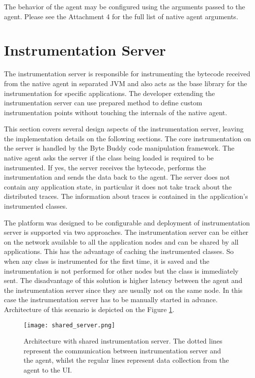 The behavior of the agent may be configured using the arguments passed to the agent. Please see the Attachment 4 for the full list of native agent arguments.

\section{Instrumentation Server}
\label{sec:inst_server}
The instrumentation server is responsible for instrumenting the bytecode received from the native agent in separated JVM and also acts as the base library for the instrumentation for specific applications. The developer extending the instrumentation server can use prepared method to define custom instrumentation points without touching the internals of the native agent.

This section covers several design aspects of the instrumentation server, leaving the implementation details on the following sections. The core instrumentation on the server is handled by the Byte Buddy code manipulation framework. The native agent asks the server if the class being loaded is required to be instrumented. If yes, the server receives the bytecode, performs the instrumentation and sends the data back to the agent. The server does not contain any application state, in particular it does not take track about the distributed traces. The information about traces is contained in the application's instrumented classes.

The platform was designed to be configurable and deployment of instrumentation server is supported via two approaches. The instrumentation server can be either on the network available to all the application nodes and can be shared by all applications. This has the advantage of caching the instrumented classes. So when any class is instrumented for the first time, it is saved and the instrumentation is not performed for other nodes but the class is immediately sent. The disadvantage of this solution is higher latency between the agent and the instrumentation server since they are usually not on the same node. In this case the instrumentation server has to be manually started in advance. Architecture of this scenario is depicted on the Figure \ref{fig:shared_server}.
 
 \begin{figure}
 	\centering
 	\texttt{[image: shared\_server.png]}
 	\caption{Architecture with shared instrumentation server. The dotted lines represent the communication between instrumentation server and the agent, whilst the regular lines represent data collection from the agent to the UI.}
 	\label{fig:shared_server}
 \end{figure}
 
